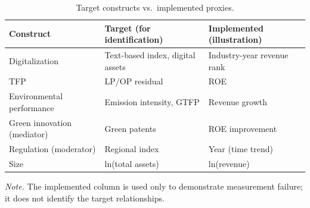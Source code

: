 \begin{table}[htbp]
  \centering
  \caption{Target constructs vs.\ implemented proxies.}
  \label{tab:target-vs-proxy}
  \small
  \begin{tabularx}{\textwidth}{@{}>{\raggedright\arraybackslash}p{2.2cm}>{\raggedright\arraybackslash}X>{\raggedright\arraybackslash}X@{}}
    \toprule
    Construct & Target (for identification) & Implemented (illustration) \\
    \midrule
    Digitalization & Text-based index, digital assets & Industry-year revenue rank \\
    TFP & LP/OP residual & ROE \\
    Environmental performance & Emission intensity, GTFP & Revenue growth \\
    Green innovation (mediator) & Green patents & ROE improvement \\
    Regulation (moderator) & Regional index & Year (time trend) \\
    Size & ln(total assets) & ln(revenue) \\
    \bottomrule
  \end{tabularx}
  \vspace{0.5em}
  \parbox{\textwidth}{\raggedright\footnotesize\textit{Note.} The implemented column is used only to demonstrate measurement failure; it does not identify the target relationships.}
\end{table}
